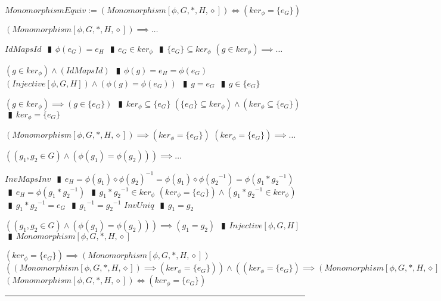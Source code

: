 \documentclass{book}
\newcommand{\abr}{:=}
\newcommand{\pipe}{$\phantom{(}\vrectangleblack\phantom{)}$}
\newcommand{\pr}[1]{\left(#1\right)}
\begin{document}
$MonomorphismEquiv \abr (Monomorphism[\phi, G, *, H, \diamond]) \iff (ker_\phi = \{e_G\})$
\begin{enumerate}
  \lit $(Monomorphism[\phi, G, *, H, \diamond]) \implies \ldots$
  \begin{enumerate}
    \lit $IdMapsId$ \pipe $\phi(e_G) = e_H$ \pipe $e_G \in ker_\phi$ \pipe $\{e_G\} \subseteq ker_\phi$
    \lit $(g \in ker_\phi) \implies \ldots$
    \begin{enumerate}
      \lit $(g \in ker_\phi) \land (IdMapsId)$ \pipe $\phi(g) = e_H = \phi(e_G)$
      \lit $(Injective[\phi, G, H]) \land \pr{\phi(g) = \phi(e_G)}$ \pipe $g = e_G$ \pipe $g \in \{e_G\}$
    \end{enumerate}
    \lit $(g \in ker_\phi) \implies (g \in \{e_G\})$ \pipe $ker_\phi \subseteq \{e_G\}$
    \lit $(\{e_G\} \subseteq ker_\phi) \land (ker_\phi \subseteq \{e_G\})$ \pipe $ker_\phi = \{e_G\}$
  \end{enumerate}
  \lit $(Monomorphism[\phi, G, *, H, \diamond]) \implies (ker_\phi = \{e_G\})$
  \lit $(ker_\phi = \{e_G\}) \implies \ldots$
  \begin{enumerate}
    \lit $\pr{(g_1, g_2 \in G) \land \pr{\phi(g_1) = \phi(g_2)}} \implies \ldots$
    \begin{enumerate}
      \lit $InvMapsInv$ \pipe $e_H = \phi(g_1) \diamond \phi(g_2)^{-1} = \phi(g_1) \diamond \phi({g_2}^{-1}) = \phi(g_1 * {g_2}^{-1})$ \pipe $e_H = \phi(g_1 * {g_2}^{-1})$ \pipe $g_1 * {g_2}^{-1} \in ker_\phi$
      \lit $(ker_\phi = \{e_G\}) \land (g_1 * {g_2}^{-1} \in ker_\phi)$ \pipe $g_1 * {g_2}^{-1} = e_G$ \pipe ${g_1}^{-1} = {g_2}^{-1}$
      \lit $InvUniq$ \pipe $g_1 = g_2$
    \end{enumerate}
    \lit $\pr{(g_1, g_2 \in G) \land \pr{\phi(g_1) = \phi(g_2)}} \implies (g_1 = g_2)$ \pipe $Injective[\phi, G, H]$ \pipe $Monomorphism[\phi, G, *, H, \diamond]$
  \end{enumerate}
  \lit $(ker_\phi = \{e_G\}) \implies (Monomorphism[\phi, G, *, H, \diamond])$
  \lit $\pr{(Monomorphism[\phi, G, *, H, \diamond]) \implies (ker_\phi = \{e_G\})} \land \pr{(ker_\phi = \{e_G\}) \implies (Monomorphism[\phi, G, *, H, \diamond])}$
  \lit $(Monomorphism[\phi, G, *, H, \diamond]) \iff (ker_\phi = \{e_G\})$
\end{enumerate} \vspace{.75mm} \hrule \vspace{.75mm} \ \\
\end{document}
